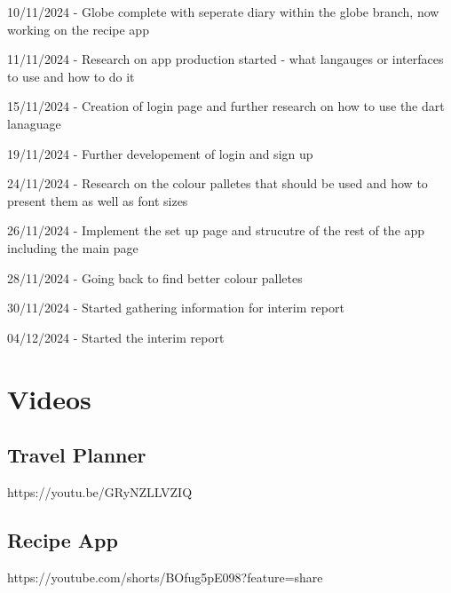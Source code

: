 \documentclass[]{project_interim}
\begin{document}
10/11/2024 - Globe complete with seperate diary within the globe branch, now working on the recipe app

11/11/2024 - Research on app production started - what langauges or interfaces to use and how to do it

15/11/2024 - Creation of login page and further research on how to use the dart lanaguage

19/11/2024 - Further developement of login and sign up

24/11/2024 - Research on the colour palletes that should be used and how to present them as well as font sizes

26/11/2024 - Implement the set up page and strucutre of the rest of the app including the main page

28/11/2024 - Going back to find better colour palletes

30/11/2024 - Started gathering information for interim report

04/12/2024 - Started the interim report



\chapter{Videos}
\section{Travel Planner}

https://youtu.be/GRyNZLLVZIQ

\section{Recipe App}

https://youtube.com/shorts/BOfug5pE098?feature=share











\end{document}

